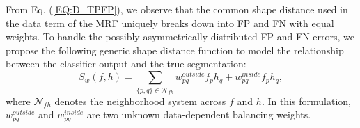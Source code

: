 \documentclass[10pt,journal,compsoc]{newIEEEtran}
\begin{document}
From Eq. (\ref{EQ:D_TPFP}), we observe that the common shape distance used in the data term of the MRF uniquely breaks down into FP and FN with equal weights. To handle the possibly asymmetrically distributed FP and FN errors, we propose the following generic shape distance function to model the relationship between the classifier output and the true segmentation:
\begin{equation}\label{EQ:SDist}
S_w(f,h) = \sum_{\{p,q\}\in\mathcal{N}_{fh}} w^{outside}_{pq}\overline{f_p}h_{q}+w^{inside}_{pq}f_p\overline{h_{q}},
\end{equation}
where $\mathcal{N}_{fh}$ denotes the neighborhood system across $f$ and $h$. In this formulation, $w^{outside}_{pq}$ and $w^{inside}_{pq}$ are two unknown data-dependent balancing weights. 
\end{document}
